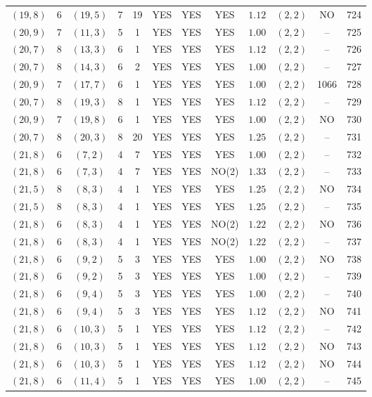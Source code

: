 \begin{longtable}{|c|c|c|c|c|c|c|c|c|c|c|c|}
$(19,8)$ & 6 & $(19,5)$ & 7 & 19 & YES & YES & YES & $1.12$ & $(2,2)$ & NO & 724\\
$(20,9)$ & 7 & $(11,3)$ & 5 & 1 & YES & YES & YES & $1.00$ & $(2,2)$ & -- & 725\\
$(20,7)$ & 8 & $(13,3)$ & 6 & 1 & YES & YES & YES & $1.12$ & $(2,2)$ & -- & 726\\
$(20,7)$ & 8 & $(14,3)$ & 6 & 2 & YES & YES & YES & $1.00$ & $(2,2)$ & -- & 727\\
$(20,9)$ & 7 & $(17,7)$ & 6 & 1 & YES & YES & YES & $1.00$ & $(2,2)$ & 1066 & 728\\
$(20,7)$ & 8 & $(19,3)$ & 8 & 1 & YES & YES & YES & $1.12$ & $(2,2)$ & -- & 729\\
$(20,9)$ & 7 & $(19,8)$ & 6 & 1 & YES & YES & YES & $1.00$ & $(2,2)$ & NO & 730\\
$(20,7)$ & 8 & $(20,3)$ & 8 & 20 & YES & YES & YES & $1.25$ & $(2,2)$ & -- & 731\\
$(21,8)$ & 6 & $(7,2)$ & 4 & 7 & YES & YES & YES & $1.00$ & $(2,2)$ & -- & 732\\
$(21,8)$ & 6 & $(7,3)$ & 4 & 7 & YES & YES & NO(2) & $1.33$ & $(2,2)$ & -- & 733\\
$(21,5)$ & 8 & $(8,3)$ & 4 & 1 & YES & YES & YES & $1.25$ & $(2,2)$ & NO & 734\\
$(21,5)$ & 8 & $(8,3)$ & 4 & 1 & YES & YES & YES & $1.25$ & $(2,2)$ & -- & 735\\
$(21,8)$ & 6 & $(8,3)$ & 4 & 1 & YES & YES & NO(2) & $1.22$ & $(2,2)$ & NO & 736\\
$(21,8)$ & 6 & $(8,3)$ & 4 & 1 & YES & YES & NO(2) & $1.22$ & $(2,2)$ & -- & 737\\
$(21,8)$ & 6 & $(9,2)$ & 5 & 3 & YES & YES & YES & $1.00$ & $(2,2)$ & NO & 738\\
$(21,8)$ & 6 & $(9,2)$ & 5 & 3 & YES & YES & YES & $1.00$ & $(2,2)$ & -- & 739\\
$(21,8)$ & 6 & $(9,4)$ & 5 & 3 & YES & YES & YES & $1.00$ & $(2,2)$ & -- & 740\\
$(21,8)$ & 6 & $(9,4)$ & 5 & 3 & YES & YES & YES & $1.12$ & $(2,2)$ & NO & 741\\
$(21,8)$ & 6 & $(10,3)$ & 5 & 1 & YES & YES & YES & $1.12$ & $(2,2)$ & -- & 742\\
$(21,8)$ & 6 & $(10,3)$ & 5 & 1 & YES & YES & YES & $1.12$ & $(2,2)$ & NO & 743\\
$(21,8)$ & 6 & $(10,3)$ & 5 & 1 & YES & YES & YES & $1.12$ & $(2,2)$ & NO & 744\\
$(21,8)$ & 6 & $(11,4)$ & 5 & 1 & YES & YES & YES & $1.00$ & $(2,2)$ & -- & 745\\

\end{longtable}
